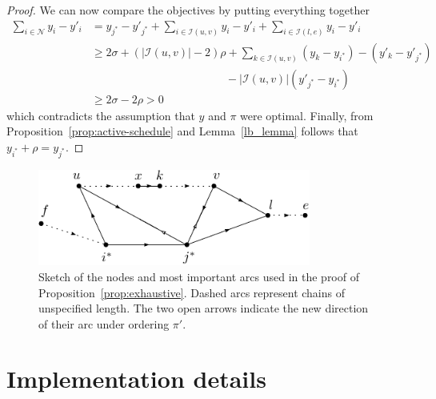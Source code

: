 \documentclass[a4paper]{article}
\theoremstyle{definition}
\theoremstyle{plain}
\begin{document}
\begin{proof}
  We can now compare the objectives by putting everything together
  \begin{align*}
    \sum_{i \in \mathcal{N}} y_{i} - y'_{i} &=  y_{j^{*}} - y'_{j^{*}} + \sum_{i \in \mathcal{I}(u, v)} y_{i} - y'_{i} + \sum_{i \in \mathcal{I}(l, e)} y_{i} - y'_{i} \\
    &\geq 2 \sigma + (|\mathcal{I}(u,v)| - 2) \rho + \sum_{k \in \mathcal{I}(u,v)} (y_{k} - y_{i^{*}}) - (y'_{k} - y'_{j^{*}}) \\ & \hspace{12em} - |\mathcal{I}(u,v)| (y'_{j^{*}} - y_{i^{*}}) \\
    &\geq 2 \sigma - 2 \rho > 0
  \end{align*}
  which contradicts the assumption that $y$ and $\pi$ were optimal.
  Finally, from Proposition~\ref{prop:active-schedule} and Lemma~\ref{lb_lemma}
  follows that $y_{i^{*}} + \rho = y_{j^{*}}$.
\end{proof}

\begin{figure}
  \centering
  \includegraphics[width=0.8\textwidth]{figures/single/platoon-preservation-proof-diagram.pdf}
  \caption{Sketch of the nodes and most important arcs used in the proof of
    Proposition~\ref{prop:exhaustive}. Dashed arcs represent chains of
    unspecified length. The two open arrows indicate the new direction of their
    arc under ordering $\pi'$.}\label{fig:platoon-preservation-diagram}
\end{figure}


\section{Implementation details}
\end{document}
